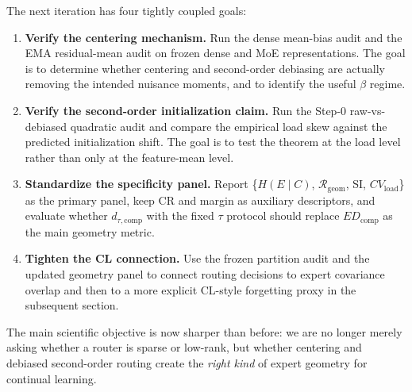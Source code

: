 \documentclass[11pt]{article}
\begin{document}
The next iteration has four tightly coupled goals:
\begin{enumerate}
    \item \textbf{Verify the centering mechanism.} Run the dense mean-bias audit and the EMA residual-mean audit on frozen dense and MoE representations. The goal is to determine whether centering and second-order debiasing are actually removing the intended nuisance moments, and to identify the useful $\beta$ regime.
    \item \textbf{Verify the second-order initialization claim.} Run the Step-0 raw-vs-debiased quadratic audit and compare the empirical load skew against the predicted initialization shift. The goal is to test the theorem at the load level rather than only at the feature-mean level.
    \item \textbf{Standardize the specificity panel.} Report \{$H(E\mid C)$, $\mathcal{R}_{\mathrm{geom}}$, SI, $CV_{\mathrm{load}}$\} as the primary panel, keep CR and margin as auxiliary descriptors, and evaluate whether $d_{\tau,\mathrm{comp}}$ with the fixed $\tau$ protocol should replace $ED_{\mathrm{comp}}$ as the main geometry metric.
    \item \textbf{Tighten the CL connection.} Use the frozen partition audit and the updated geometry panel to connect routing decisions to expert covariance overlap and then to a more explicit CL-style forgetting proxy in the subsequent section.
\end{enumerate}

The main scientific objective is now sharper than before: we are no longer merely asking whether a router is sparse or low-rank, but whether centering and debiased second-order routing create the \emph{right kind} of expert geometry for continual learning.
\end{document}
